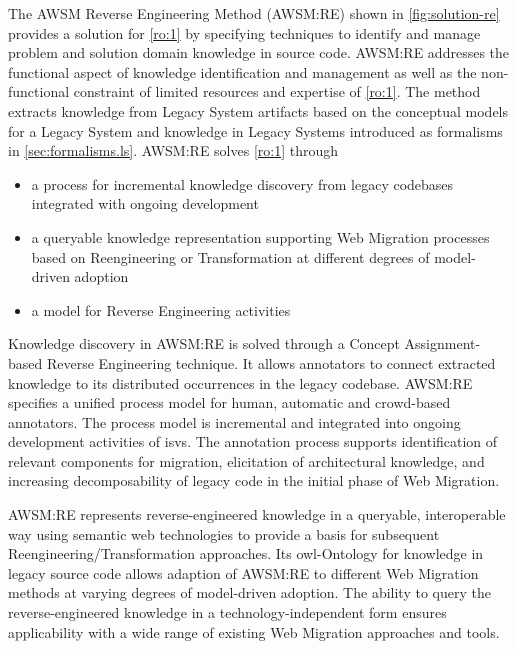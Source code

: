 The AWSM Reverse Engineering Method (AWSM:RE) shown in \cref{fig:solution-re} provides a solution for \cref{ro:1} by specifying techniques to identify and manage problem and solution domain knowledge in  source code.
AWSM:RE addresses the functional aspect of knowledge identification and management as well as the non-functional constraint of limited resources and expertise of \cref{ro:1}.
The method extracts knowledge from \gls{Legacy System} \glspl{artifact} based on the conceptual models for a \gls{Legacy System} and knowledge in \glspl{Legacy System} introduced as formalisms in \cref{sec:formalisms.ls}.
AWSM:RE solves \cref{ro:1} through
\vspace{12pt}
\begin{itemize}
\item a process for incremental knowledge discovery from legacy codebases integrated with ongoing development
\item a queryable knowledge representation supporting \gls{Web Migration} processes based on \gls{Reengineering} or \gls{Transformation} at different degrees of model-driven adoption
\item a model for  \gls{Reverse Engineering} activities
\end{itemize}

\par\smallskip
Knowledge discovery in AWSM:RE is solved through a \gls{Concept Assignment}-based \gls{Reverse Engineering} technique.
It allows annotators to connect extracted knowledge to its distributed occurrences in the legacy codebase.
AWSM:RE specifies a unified process model for human, automatic and crowd-based annotators.
The process model is incremental and integrated into ongoing development activities of \glspl{isv}.
The annotation process supports identification of relevant components for migration, elicitation of architectural knowledge, and increasing decomposability of legacy code in the initial phase of \gls{Web Migration}.

AWSM:RE represents reverse-engineered knowledge in a queryable, interoperable way using semantic \gls{web} technologies to provide a basis for subsequent \gls{Reengineering}/\gls{Transformation} approaches.
Its \gls{owl}-Ontology for knowledge in legacy source code allows adaption of AWSM:RE to different \gls{Web Migration} methods at varying degrees of model-driven adoption.
The ability to query the reverse-engineered knowledge in a technology-independent form ensures applicability with a wide range of existing \gls{Web Migration} approaches and tools.

